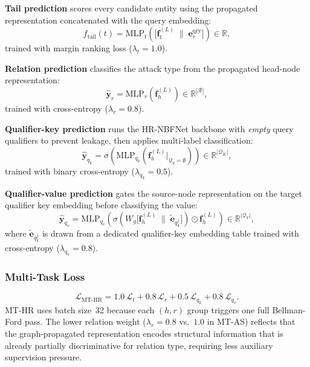 \documentclass[10pt,journal,compsoc]{IEEEtran}
\begin{document}
\textbf{Tail prediction} scores every candidate entity using
the propagated representation concatenated with the query
embedding:
\begin{equation}
  f_{\mathrm{tail}}(t)
  = \mathrm{MLP}_t\!\left(
      \bigl[\mathbf{f}_t^{(L)}
      \;\|\; \mathbf{e}_r^{\mathrm{qry}}\bigr]
    \right) \in \mathbb{R},
  \label{eq:mthr_tail}
\end{equation}
trained with margin ranking loss ($\lambda_t{=}1.0$).

\textbf{Relation prediction} classifies the attack type
from the propagated head-node representation:
\begin{equation}
  \hat{\mathbf{y}}_r
  = \mathrm{MLP}_r\!\left(\mathbf{f}_h^{(L)}\right)
  \in \mathbb{R}^{|\mathcal{R}|},
  \label{eq:mthr_rel}
\end{equation}
trained with cross-entropy ($\lambda_r{=}0.8$).

\textbf{Qualifier-key prediction} runs the HR-NBFNet
backbone with \emph{empty} query qualifiers to prevent
leakage, then applies multi-label classification:
\begin{equation}
  \hat{\mathbf{y}}_{q_k}
  = \sigma\!\left(
      \mathrm{MLP}_{q_k}\!\left(
        \mathbf{f}_h^{(L)}\big|_{\mathcal{Q}_q=\emptyset}
      \right)
    \right)
  \in \mathbb{R}^{|\mathcal{Q}_K|},
  \label{eq:mthr_qk}
\end{equation}
trained with binary cross-entropy ($\lambda_{q_k}{=}0.5$).

\textbf{Qualifier-value prediction} gates the source-node
representation on the target qualifier key embedding before
classifying the value:
\begin{equation}
  \hat{\mathbf{y}}_{q_v}
  = \mathrm{MLP}_{q_v}\!\left(
      \sigma\!\left(
        W_g \bigl[
          \mathbf{f}_h^{(L)}
          \;\|\;
          \tilde{\mathbf{e}}_{q_k^j}
        \bigr]
      \right)
      \odot \mathbf{f}_h^{(L)}
    \right)
  \in \mathbb{R}^{|\mathcal{Q}_V|},
  \label{eq:mthr_qv}
\end{equation}
where $\tilde{\mathbf{e}}_{q_k^j}$ is drawn from a
dedicated qualifier-key embedding table
trained with cross-entropy ($\lambda_{q_v}{=}0.8$).

\subsubsection{Multi-Task Loss}
\begin{equation}
  \mathcal{L}_{\mathrm{MT\text{-}HR}}
  = 1.0\,\mathcal{L}_t
  + 0.8\,\mathcal{L}_r
  + 0.5\,\mathcal{L}_{q_k}
  + 0.8\,\mathcal{L}_{q_v}.
  \label{eq:mthr_loss}
\end{equation}
MT-HR uses batch size~32 because each $(h,r)$ group triggers
one full Bellman-Ford pass.
The lower relation weight ($\lambda_r{=}0.8$ vs.\
$1.0$ in MT-AS) reflects that the graph-propagated
representation encodes structural information that is
already partially discriminative for relation type,
requiring less auxiliary supervision pressure.
\end{document}
